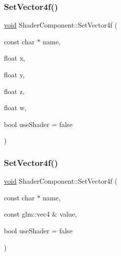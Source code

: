 \mbox{\label{classShaderComponent_a2d7b6091a6b20cbb7ed5a219504d5f8e}} 
\subsubsection{\texorpdfstring{Set\+Vector4f()}{SetVector4f()}\hspace{0.1cm}{\footnotesize\ttfamily [1/2]}}
{\footnotesize\ttfamily \hyperlink{imgui__impl__opengl3__loader_8h_ac668e7cffd9e2e9cfee428b9b2f34fa7}{void} Shader\+Component\+::\+Set\+Vector4f (\begin{DoxyParamCaption}\item[{const char $\ast$}]{name,  }\item[{float}]{x,  }\item[{float}]{y,  }\item[{float}]{z,  }\item[{float}]{w,  }\item[{bool}]{use\+Shader = {\ttfamily false} }\end{DoxyParamCaption})}

\mbox{\label{classShaderComponent_a241661f9491daf849d6b9a6d4ba497ff}} 
\subsubsection{\texorpdfstring{Set\+Vector4f()}{SetVector4f()}\hspace{0.1cm}{\footnotesize\ttfamily [2/2]}}
{\footnotesize\ttfamily \hyperlink{imgui__impl__opengl3__loader_8h_ac668e7cffd9e2e9cfee428b9b2f34fa7}{void} Shader\+Component\+::\+Set\+Vector4f (\begin{DoxyParamCaption}\item[{const char $\ast$}]{name,  }\item[{const glm\+::vec4 \&}]{value,  }\item[{bool}]{use\+Shader = {\ttfamily false} }\end{DoxyParamCaption})}

\mbox{\label{classShaderComponent_ab8f4b5e17bf77b20e509ac94c9dddc10}} 
